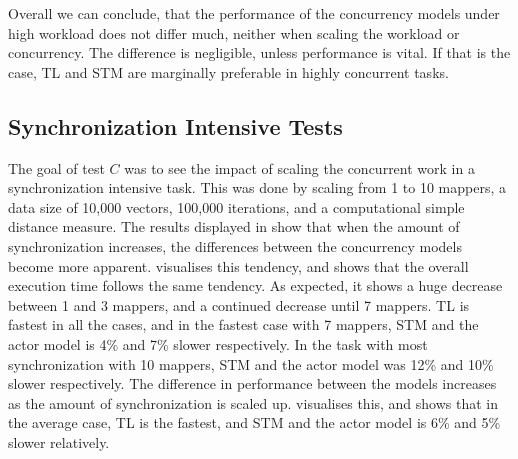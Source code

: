 %
Overall we can conclude, that the performance of the concurrency models under high workload does not differ much, neither when scaling the workload or concurrency. The difference is negligible, unless performance is vital. If that is the case, \ac{TL} and \ac{STM} are marginally preferable in highly concurrent tasks.%
%
\FloatBarrier
\subsection{Synchronization Intensive Tests}
%
The goal of test $C$ was to see the impact of scaling the concurrent work in a synchronization intensive task. This was done by scaling from 1 to 10 mappers, a data size of 10,000 vectors, 100,000 iterations, and a computational simple distance measure. The results displayed in  show that when the amount of synchronization increases, the differences between the concurrency models become more apparent.  visualises this tendency, and shows that the overall execution time follows the same tendency. As expected, it shows a huge decrease between 1 and 3 mappers, and a continued decrease until 7 mappers. \ac{TL} is fastest in all the cases, and in the fastest case with 7 mappers, \ac{STM} and the actor model is 4\% and 7\% slower respectively. In the task with most synchronization with 10 mappers, \ac{STM} and the actor model was 12\% and 10\% slower respectively. The difference in performance between the models increases as the amount of synchronization is scaled up.  visualises this, and shows that in the average case, \ac{TL} is the fastest, and \ac{STM} and the actor model is 6\% and 5\% slower relatively.
%
